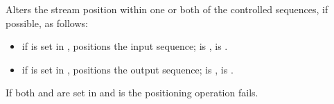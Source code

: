 \documentclass[ebook,11pt,article]{memoir}
\renewcommand{\iref}[1]{[#1]}
\begin{document}
\begin{itemdescr}
\pnum
\effects
Alters the stream position within one or both of the
controlled sequences, if possible, as follows:
\begin{itemize}
\item if  is set in , positions the input sequence;  is ,  is .
\item if  is set in , positions the output sequence;  is ,  is .
\end{itemize}

\pnum
If both  and  are set in  and  is 
the positioning operation fails.





\end{itemdescr}
\end{document}
